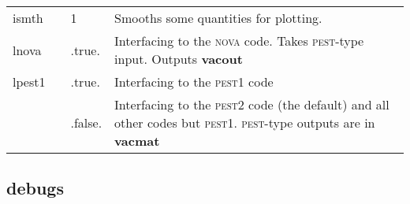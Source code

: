 \documentclass[10pt]{article}
\newcommand{\stylb}[1]{\textbf{#1}}
\newcommand{\stylc}[1]{\textsc{#1}}
\begin{document}
\begin{center}
\begin{tabular}{|l|l|p{1.0in}|p{3.8in}|}
ismth    &  & 1 & Smooths some quantities  for plotting. \\

lnova    &  & .true.  & Interfacing to the \stylc{nova} code. Takes
\stylc{pest}-type input. Outputs \stylb{vacout}\\

lpest1 & & .true.  & Interfacing to the \stylc{pest1} code\\ 

       & & .false. & Interfacing to the \stylc{pest2} code (the
         default) and all other codes but
         \stylc{pest1}. \stylc{pest}-type outputs are in
         \stylb{vacmat}\\ \hline
\end{tabular}
\end{center}

\subsection{debugs}
\end{document}
